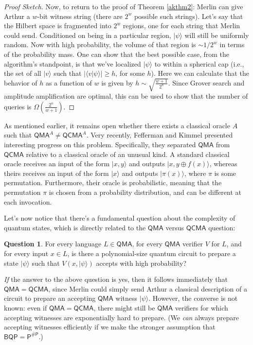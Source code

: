 \documentclass[11pt]{report}
\theoremstyle{plain}
\theoremstyle{definition}
\newtheorem{question}[theorem]{Question}
\renewcommand{\ket}[1]{|#1\rangle}
\newcommand{\braket}[2]{\langle#1|#2\rangle}
\begin{document}
\begin{proof}[Proof Sketch]
Now, to return to the proof of Theorem \ref{akthm2}: Merlin can give Arthur a $w$-bit witness string (there are $2^w$ possible such
strings).
Let's say that the Hilbert space is fragmented into $2^w$ regions, one for each string that Merlin could send.
Conditioned on being in a particular region, $\ket{\psi}$ will still be
uniformly random.
Now with high probability, the volume of that region is $\sim 1 / 2^w$ in terms of the probability mass.
One can show that the best possible case, from the algorithm's standpoint, is that we've localized $\ket{ \psi }$ to within a spherical cap (i.e., the set of all $\ket{v}$ such that $| \braket{ v }{ \psi } |
\geq h$, for some $h$).
Here we can calculate that the behavior of $h$ as a function of $w$ is given by $h \sim \sqrt{\frac{w + 1}{2^n}}$.
Since Grover search and amplitude amplification are optimal, this can be used to show that the number of queries is $\Omega\left(\frac{2^n}{w+1}\right)$.

\end{proof}

As mentioned earlier, it remains open whether there exists a classical oracle $A$ such that $\mathsf{QMA}^A \neq \mathsf{QCMA}^A$.
Very recently, Fefferman and Kimmel \cite{FK15} presented interesting progress on this problem.
Specifically, they separated $\mathsf{QMA}$ from $\mathsf{QCMA}$ relative to a classical oracle of an unusual kind.
A standard classical oracle receives an input of the form $\ket{x,y}$ and outputs $\ket{x, y\oplus f(x)}$, whereas theirs receives an input of the form $\ket{x}$ and outputs $\ket{\pi(x)}$, where $\pi$ is some permutation.  Furthermore, their oracle is probabilistic, meaning that the permutation $\pi$ is chosen from a probability distribution, and can be different at each invocation.

Let's now notice that there's a fundamental question about the complexity of quantum states, which is directly related to the $\mathsf{QMA}$ versus $\mathsf{QCMA}$ question:

\begin{question}
\label{qmaques}
For every language $L\in \mathsf{QMA}$, for every $\mathsf{QMA}$ verifier $V$ for $L$, and for every input $x\in L$, is there a polynomial-size quantum circuit to prepare a state $\ket{ \psi}$ such that $V(x,\ket{\psi})$ accepts with high probability?
\end{question}

{\em If} the answer to the above question is yes, then it follows immediately that $\mathsf{QMA}=\mathsf{QCMA}$, since Merlin could simply send Arthur a classical description of a circuit
to prepare an accepting $\mathsf{QMA}$ witness $\ket{ \psi}$.  However, the converse is not known: even if $\mathsf{QMA}=\mathsf{QCMA}$, there might still be $\mathsf{QMA}$ verifiers for
which accepting witnesses are exponentially hard to prepare.  (We {\em can} always prepare accepting witnesses efficiently if we make the stronger assumption that $\mathsf{BQP}=\mathsf{P^{\#P}}$.)
\end{document}
